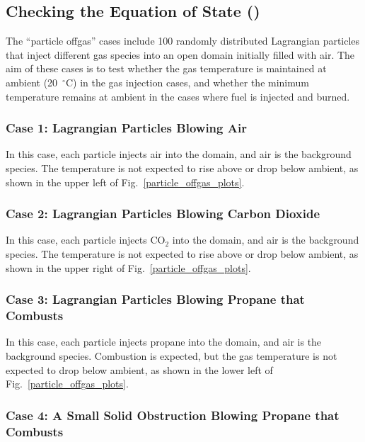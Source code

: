 \documentclass[11pt]{book}
\begin{document}
\subsection{Checking the Equation of State (\texorpdfstring{}{particle\_offgas})}
\label{particle_offgas_1}
\label{particle_offgas_2}
\label{particle_offgas_3}
\label{particle_offgas_4}

The ``particle offgas'' cases include 100 randomly distributed Lagrangian particles that inject different gas species into an open domain initially filled with air. The aim of these cases is to test whether the gas temperature is maintained at ambient (20~$^\circ$C) in the gas injection cases, and whether the minimum temperature remains at ambient in the cases where fuel is injected and burned.

\subsubsection{Case 1: Lagrangian Particles Blowing Air}

In this case, each particle injects air into the domain, and air is the background species. The temperature is not expected to rise above or drop below ambient, as shown in the upper left of Fig.~\ref{particle_offgas_plots}.

\subsubsection{Case 2: Lagrangian Particles Blowing Carbon Dioxide}

In this case, each particle injects CO$_2$ into the domain, and air is the background species. The temperature is not expected to rise above or drop below ambient, as shown in the upper right of Fig.~\ref{particle_offgas_plots}.

\subsubsection{Case 3: Lagrangian Particles Blowing Propane that Combusts}

In this case, each particle injects propane into the domain, and air is the background species. Combustion is expected, but the gas temperature is not expected to drop below ambient, as shown in the lower left of Fig.~\ref{particle_offgas_plots}.

\subsubsection{Case 4: A Small Solid Obstruction Blowing Propane that Combusts}
\end{document}
